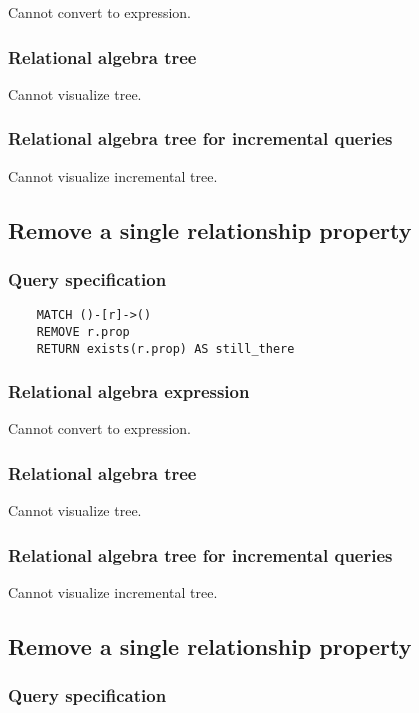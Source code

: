	Cannot convert to expression.

	\subsubsection*{Relational algebra tree}

	Cannot visualize tree.

	\subsubsection*{Relational algebra tree for incremental queries}

	Cannot visualize incremental tree.
	\subsection{Remove a single relationship property}

	\subsubsection*{Query specification}

	\begin{lstlisting}
	MATCH ()-[r]->()
	REMOVE r.prop
	RETURN exists(r.prop) AS still_there
	\end{lstlisting}


	\subsubsection*{Relational algebra expression}

	Cannot convert to expression.

	\subsubsection*{Relational algebra tree}

	Cannot visualize tree.

	\subsubsection*{Relational algebra tree for incremental queries}

	Cannot visualize incremental tree.
	\subsection{Remove a single relationship property}

	\subsubsection*{Query specification}

